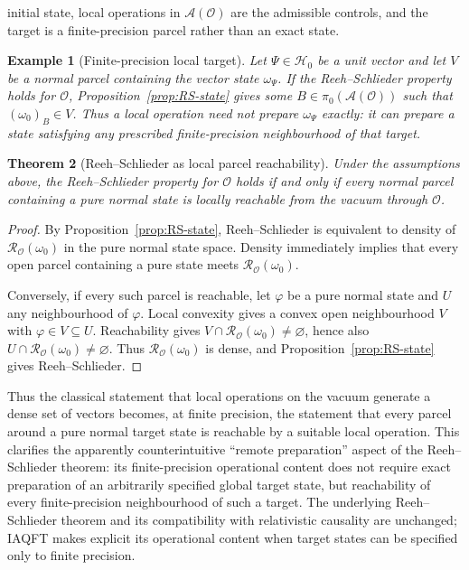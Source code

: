 \documentclass[11pt]{article}
\newtheorem{theorem}{Theorem}[section]
\newtheorem{example}[theorem]{Example}
\newcommand{\A}{\mathcal{A}}
\begin{document}
initial state, local operations in $\A(\mathcal O)$ are the admissible
controls, and the target is a finite-precision parcel rather than an
exact state.
\begin{example}[Finite-precision local target]
Let $\Psi\in\mathcal H_0$ be a unit vector and let $V$ be a normal parcel
containing the vector state $\omega_\Psi$. If the Reeh--Schlieder
property holds for $\mathcal O$, Proposition~\ref{prop:RS-state} gives
some $B\in\pi_0(\A(\mathcal O))$ such that $(\omega_0)_B\in V$.
Thus a local operation need not prepare $\omega_\Psi$ exactly: it can
prepare a state satisfying any prescribed finite-precision neighbourhood
of that target.
\end{example}
\begin{theorem}[Reeh--Schlieder as local parcel reachability]
\label{thm:reehschlieder}
Under the assumptions above, the Reeh--Schlieder property for
$\mathcal O$ holds if and only if every normal parcel containing a pure
normal state is locally reachable from the vacuum through $\mathcal O$.
\end{theorem}

\begin{proof}
By Proposition~\ref{prop:RS-state}, Reeh--Schlieder is equivalent to
density of $\mathcal R_{\mathcal O}(\omega_0)$ in the pure normal state
space. Density immediately implies that every open parcel containing a
pure state meets $\mathcal R_{\mathcal O}(\omega_0)$.

Conversely, if every such parcel is reachable, let $\varphi$ be a pure
normal state and $U$ any neighbourhood of $\varphi$. Local convexity gives
a convex open neighbourhood $V$ with $\varphi\in V\subseteq U$.
Reachability gives
$V\cap\mathcal R_{\mathcal O}(\omega_0)\neq\varnothing$, hence also
$U\cap\mathcal R_{\mathcal O}(\omega_0)\neq\varnothing$. Thus
$\mathcal R_{\mathcal O}(\omega_0)$ is dense, and
Proposition~\ref{prop:RS-state} gives Reeh--Schlieder.
\end{proof}

Thus the classical statement that local operations on the vacuum generate
a dense set of vectors becomes, at finite precision, the statement that
every parcel around a pure normal target state is reachable by a suitable
local operation. This clarifies the apparently counterintuitive
``remote preparation'' aspect of the Reeh--Schlieder theorem: its
finite-precision operational content does not require exact preparation
of an arbitrarily specified global target state, but reachability of every
finite-precision neighbourhood of such a target. The underlying
Reeh--Schlieder theorem and its compatibility with relativistic causality
are unchanged; IAQFT makes explicit its operational content when target
states can be specified only to finite precision.
\end{document}
